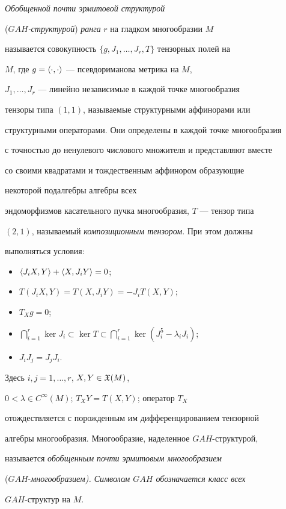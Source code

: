 \begin{defn}


{\it Обобщенной почти эрмитовой структурой}


({\it $GAH$-струк\-ту\-рой}) {\it ранга} $r$ на гладком многообразии $M$


называется совокупность $\{g,J_1,\dotsc,J_r,T\}$ тензорных полей на


$M$, где $g=\langle\cdot,\cdot\rangle$ --- псевдориманова метрика на $M$,


$J_1,\dotsc,J_r$ --- линейно независимые в каждой точке многообразия


тензоры типа $(1,1)$, называемые структурными аффинорами или


структурными операторами. Они определены в каждой точке многообразия


с точностью до ненулевого числового множителя и представляют вместе


со своими квадратами и тождественным аффинором образующие


некоторой подалгебры алгебры всех


эндоморфизмов касательного пучка многообразия, $T$ --- тензор типа


$(2,1)$, называемый {\it композиционным тензором}. При этом должны


выполняться условия:


\begin{itemize}


\item[1.] $\langle J_iX,Y\rangle+\langle X,J_iY\rangle =0$;


\item[2.] $T(J_iX,Y)=T(X,J_iY)=-J_iT(X,Y)$;


\item[3.] $T_Xg=0$;


\item[4.] $\bigcap\limits_{i=1}^r \ker J_i\subset \ker T\subset


\bigcap\limits_{i=1}^r \ker(J_i^5-\lambda_i J_i)$;


\item[5.] $J_i J_j=J_j J_i$.


\end{itemize}


Здесь $i,j=1,\dotsc,r$, $X,Y\in \frak{X}(M)$,


$0<\lambda\in C^\infty(M)$; $T_X Y=T(X,Y)$; оператор $T_X$


отождествляется с порожденным им дифференцированием тензорной


алгебры многообразия. Многообразие, наделенное $GAH$-структурой,


называется {\it обобщенным почти эрмитовым многообразием}


($GAH$-\it {многообразием}). Символом $GAH$ обозначается класс всех


$GAH$-структур на $M$.


\end{defn}





